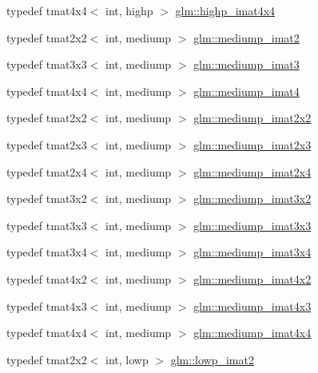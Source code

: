 \begin{DoxyCompactItemize}
\item 
typedef tmat4x4$<$ int, highp $>$ \hyperlink{group__gtc__matrix__integer_ga2a80b8ab686297145ecf713699233114}{glm\+::highp\+\_\+imat4x4}
\item 
typedef tmat2x2$<$ int, mediump $>$ \hyperlink{group__gtc__matrix__integer_gae812330b83568359273b6ec96b002863}{glm\+::mediump\+\_\+imat2}
\item 
typedef tmat3x3$<$ int, mediump $>$ \hyperlink{group__gtc__matrix__integer_gab033bd6a2bfebb1aa35d458c6f077ccb}{glm\+::mediump\+\_\+imat3}
\item 
typedef tmat4x4$<$ int, mediump $>$ \hyperlink{group__gtc__matrix__integer_ga680c97868de08658ca4924718d951def}{glm\+::mediump\+\_\+imat4}
\item 
typedef tmat2x2$<$ int, mediump $>$ \hyperlink{group__gtc__matrix__integer_ga52a40f2f95562746fd8084726a300963}{glm\+::mediump\+\_\+imat2x2}
\item 
typedef tmat2x3$<$ int, mediump $>$ \hyperlink{group__gtc__matrix__integer_ga07314e9f05b82367570ca44c3ef7c0a7}{glm\+::mediump\+\_\+imat2x3}
\item 
typedef tmat2x4$<$ int, mediump $>$ \hyperlink{group__gtc__matrix__integer_ga944a139f15de6bc12e9c7bf615ffc4f5}{glm\+::mediump\+\_\+imat2x4}
\item 
typedef tmat3x2$<$ int, mediump $>$ \hyperlink{group__gtc__matrix__integer_ga8f682b5b64e2072c0729409ee6bfe2af}{glm\+::mediump\+\_\+imat3x2}
\item 
typedef tmat3x3$<$ int, mediump $>$ \hyperlink{group__gtc__matrix__integer_gab4c647321a342c58119144ad08c6c406}{glm\+::mediump\+\_\+imat3x3}
\item 
typedef tmat3x4$<$ int, mediump $>$ \hyperlink{group__gtc__matrix__integer_ga721a754fc35cc5ac097e331d893a6b2c}{glm\+::mediump\+\_\+imat3x4}
\item 
typedef tmat4x2$<$ int, mediump $>$ \hyperlink{group__gtc__matrix__integer_gabfe107153637dfd7a0c272ff1ba892ed}{glm\+::mediump\+\_\+imat4x2}
\item 
typedef tmat4x3$<$ int, mediump $>$ \hyperlink{group__gtc__matrix__integer_ga0da8b13e141337d016a6541ea2c0362c}{glm\+::mediump\+\_\+imat4x3}
\item 
typedef tmat4x4$<$ int, mediump $>$ \hyperlink{group__gtc__matrix__integer_gae226af929e72730be59a58d89a4be028}{glm\+::mediump\+\_\+imat4x4}
\item 
typedef tmat2x2$<$ int, lowp $>$ \hyperlink{group__gtc__matrix__integer_ga4840a4d8b9e8997f1173da9e8e5e4de4}{glm\+::lowp\+\_\+imat2}

\end{DoxyCompactItemize}
